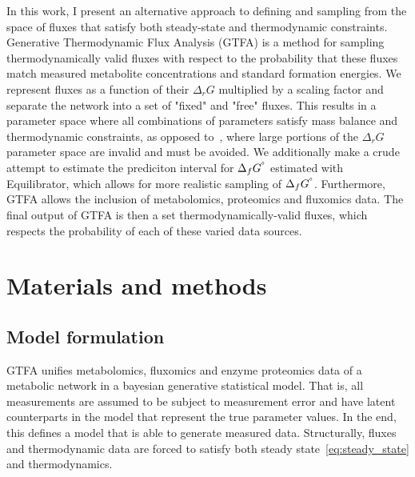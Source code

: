 \documentclass[10pt,letterpaper]{article}
\newcommand{\sdgf}{\Delta_fG^{\degree}}
\newcommand{\dgr}{\Delta_rG}
\begin{document}

In this work, I present an alternative approach to defining and sampling from the space of fluxes that satisfy both steady-state and thermodynamic constraints.
Generative Thermodynamic Flux Analysis (GTFA) is a method for sampling thermodynamically valid fluxes with respect to the probability that these fluxes match measured metabolite concentrations and standard formation energies.
We represent fluxes as a function of their $\dgr$ multiplied by a scaling factor and separate the network into a set of "fixed" and "free" fluxes.
This results in a parameter space where all combinations of parameters satisfy mass balance and thermodynamic constraints, as opposed to~\cite{PTA}, where large portions of the $\dgr$ parameter space are invalid and must be avoided.
We additionally make a crude attempt to estimate the prediciton interval for $\sdgf$ estimated with Equilibrator, which allows for more realistic sampling of $\sdgf$.
Furthermore, GTFA allows the inclusion of metabolomics, proteomics and fluxomics data.
The final output of GTFA is then a set thermodynamically-valid fluxes, which respects the probability of each of these varied data sources.




\section*{Materials and methods}

\subsection{Model formulation}
GTFA unifies metabolomics, fluxomics and enzyme proteomics data of a metabolic network in a bayesian generative statistical model.
That is, all measurements are assumed to be subject to measurement error and have latent counterparts in the model that represent the true parameter values.
In the end, this defines a model that is able to generate measured data.
Structurally, fluxes and thermodynamic data are forced to satisfy both steady state~\ref{eq:steady_state} and thermodynamics.
\end{document}
